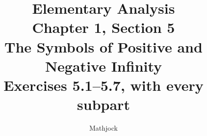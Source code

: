 
\title{\textbf{Elementary Analysis}\\[0.3em]
Chapter 1, Section 5\\[0.3em]
\large The Symbols of Positive and Negative Infinity\\
Exercises 5.1--5.7, with every subpart}
\author{Mathjock}
\date{}

\maketitle
\bookinfo
\tableofcontents
\clearpage
\setcounter{section}{4}


